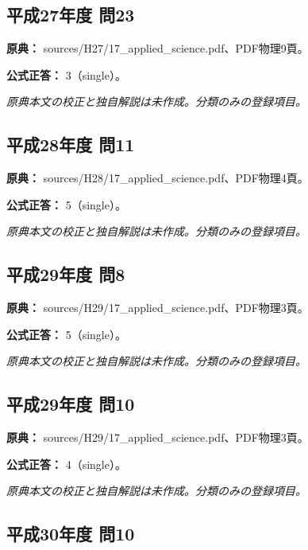 \subsection{平成27年度 問23}
\label{q:h27-reg-applied-23}

\noindent\textbf{原典：} sources/H27/17\_applied\_science.pdf、PDF物理9頁。

\textbf{公式正答：} 3（single）。

\par\textit{原典本文の校正と独自解説は未作成。分類のみの登録項目。}

\subsection{平成28年度 問11}
\label{q:h28-reg-applied-11}

\noindent\textbf{原典：} sources/H28/17\_applied\_science.pdf、PDF物理4頁。

\textbf{公式正答：} 5（single）。

\par\textit{原典本文の校正と独自解説は未作成。分類のみの登録項目。}

\subsection{平成29年度 問8}
\label{q:h29-reg-applied-08}

\noindent\textbf{原典：} sources/H29/17\_applied\_science.pdf、PDF物理3頁。

\textbf{公式正答：} 5（single）。

\par\textit{原典本文の校正と独自解説は未作成。分類のみの登録項目。}

\subsection{平成29年度 問10}
\label{q:h29-reg-applied-10}

\noindent\textbf{原典：} sources/H29/17\_applied\_science.pdf、PDF物理3頁。

\textbf{公式正答：} 4（single）。

\par\textit{原典本文の校正と独自解説は未作成。分類のみの登録項目。}

\subsection{平成30年度 問10}
\label{q:h30-reg-applied-10}

